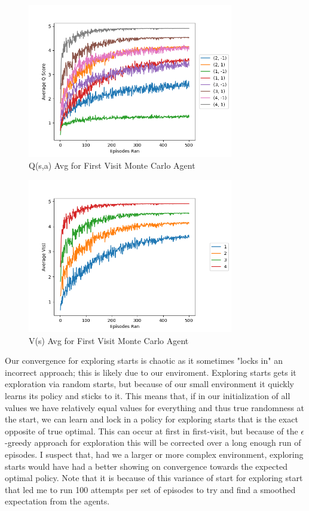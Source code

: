 \documentclass{article}
\begin{document}
\begin{figure}
    \centering
    \includegraphics[width = 0.8\textwidth]{results_first_visit_q.png}
    \caption{Q(s,a) Avg for First Visit Monte Carlo Agent}
\end{figure}

\begin{figure}
    \centering
    \includegraphics[width = 0.8\textwidth]{results_first_visit_v.png}
    \caption{V(s) Avg for First Visit Monte Carlo Agent}
\end{figure}

Our convergence for exploring starts is chaotic as it sometimes "locks in" an incorrect approach; this is likely due to our enviroment. Exploring starts gets it exploration via random starts, but because of our small environment it quickly learns its policy and sticks to it. This means that, if in our initialization of all values we have relatively equal values for everything and thus true randomness at the start, we can learn and lock in a policy for exploring starts that is the exact opposite of true optimal. This can occur at first in first-visit, but because of the $\epsilon$-greedy approach for exploration this will be corrected over a long enough run of episodes. I suspect that, had we a larger or more complex environment, exploring starts would have had a better showing on convergence towards the expected optimal policy. Note that it is because of this variance of start for exploring start that led me to run 100 attempts per set of episodes to try and find a smoothed expectation from the agents.
\end{document}
